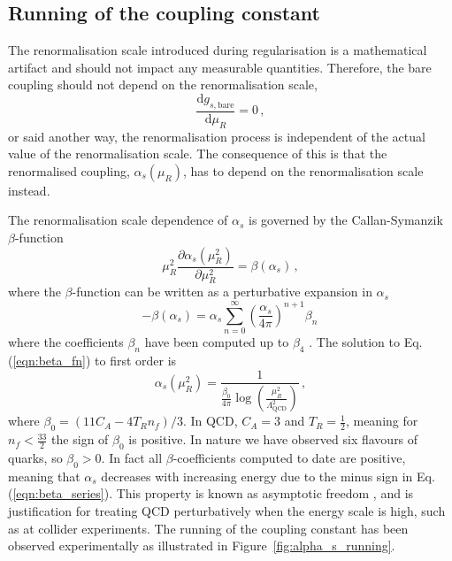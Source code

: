 \documentclass[main.tex]{subfiles}
\begin{document}
\subsection{Running of the coupling constant}\label{sec:alpha_running}
    The renormalisation scale introduced during regularisation
    is a mathematical artifact and should not impact any measurable
    quantities. Therefore, the bare coupling should not depend on
    the renormalisation scale,
    \begin{equation}\label{eqn:d_g_bare_d_mu}
        \dfrac{\mathrm{d}g_{s,\mathrm{bare}}}{\mathrm{d}\mu_{R}} = 0 \, ,
    \end{equation}
    or said another way, the renormalisation process
    is independent of the actual value of the renormalisation scale.
    The consequence of this is that the renormalised coupling, $\alpha_{s}(\mu_{R})$, has to
    depend on the renormalisation scale instead.

    The renormalisation scale dependence of $\alpha_{s}$
    is governed by the Callan-Symanzik 
    $\beta$-function \cite{Callan:1970yg,Symanzik:1970rt}
    \begin{equation}\label{eqn:beta_fn}
        \mu_{R}^{2} \dfrac{\partial \alpha_{s}(\mu_{R}^{2})}{\partial \mu_{R}^{2}} = \beta(\alpha_{s}) \, ,
    \end{equation}
    where the $\beta$-function can be written as a perturbative
    expansion in $\alpha_{s}$
    \begin{equation}\label{eqn:beta_series}
        -\beta(\alpha_{s}) = \alpha_{s}\sum_{n=0}^{\infty}\left(\dfrac{\alpha_{s}}{4\pi}\right)^{n+1} \beta_{n}\, 
    \end{equation}
    where the coefficients $\beta_{n}$ have been computed
    up to $\beta_{4}$ \cite{Baikov:2016tgj,Luthe:2017ttg}.
    The solution to Eq. (\ref{eqn:beta_fn}) to first order
    is
    \begin{equation}\label{eqn:1l_alpha}
        \alpha_{s}(\mu_{R}^{2}) = \dfrac{1}{\frac{\beta_{0}}{4\pi}\log\left(\frac{\mu_{R}^{2}}{\Lambda_{\mathrm{QCD}}^{2}}\right)} \, ,
    \end{equation}
    where $\beta_{0} = (11C_{A} - 4T_{R}n_{f})/3$.
    In QCD, $C_{A}=3$ and $T_{R}=\frac{1}{2}$, meaning for
    $n_{f} < \frac{33}{2}$ the sign of $\beta_{0}$ is positive.
    In nature we have observed six flavours of quarks, so
    $\beta_{0} > 0$. In fact all $\beta$-coefficients
    computed to date are positive, meaning that $\alpha_{s}$
    decreases with increasing energy due to the minus sign
    in Eq. (\ref{eqn:beta_series}). This property is known as
    asymptotic freedom \cite{Gross:1973id,Politzer:1973fx},
    and is justification for treating QCD perturbatively
    when the energy scale is high, such as at collider experiments.
    The running of the coupling constant has been
    observed experimentally as illustrated in Figure~\ref{fig:alpha_s_running}.
\end{document}
